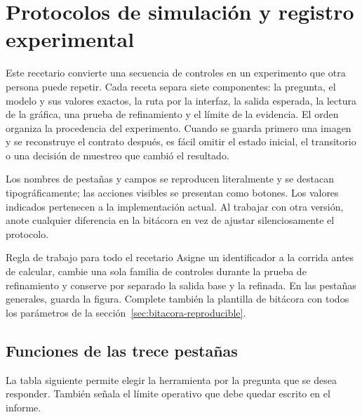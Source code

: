 
\section{Protocolos de simulación y registro experimental}
\label{sec:recetario-ampliado}

Este recetario convierte una secuencia de controles en un experimento que otra
persona puede repetir. Cada receta separa siete componentes: la pregunta, el
modelo y sus valores exactos, la ruta por la interfaz, la salida esperada, la
lectura de la gráfica, una prueba de refinamiento y el límite de la evidencia.
El orden organiza la procedencia del experimento. Cuando se guarda primero una imagen y se reconstruye el
contrato después, es fácil omitir el estado inicial, el transitorio o una
decisión de muestreo que cambió el resultado.

Los nombres de pestañas y campos se reproducen literalmente y se destacan
tipográficamente; las acciones visibles se presentan como botones. Los valores
indicados pertenecen a la implementación actual. Al trabajar con otra versión,
anote cualquier diferencia en la bitácora en vez de ajustar silenciosamente el
protocolo.

\begin{cajaazul}{Regla de trabajo para todo el recetario}
Asigne un identificador a la corrida antes de calcular, cambie una sola familia
de controles durante la prueba de refinamiento y conserve por separado la
salida base y la refinada. En las pestañas generales, 
guarda la figura. Complete también la plantilla de bitácora con todos los
parámetros de la
sección~\ref{sec:bitacora-reproducible}.
\end{cajaazul}

\subsection{Funciones de las trece pestañas}

La tabla siguiente permite elegir la herramienta por la pregunta que se desea
responder. También señala el límite operativo que debe quedar escrito en el
informe.

